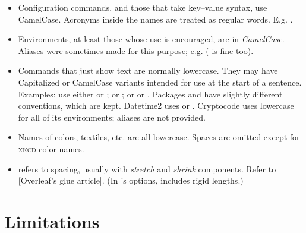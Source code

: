 \begin{BigPages} [hmargin=0.5cm, vmargin=1cm]
\begin{itemize}[long]
    \item Configuration commands, and those that take key--value syntax, use CamelCase.
          Acronyms inside the names are treated as regular words. E.g. .
    \item Environments, at least those whose use is encouraged, are in \textit{CamelCase}.
          Aliases were sometimes made for this purpose; e.g. 
          ( is fine too).
    \item Commands that just show text are normally lowercase. They may have Capitalized or CamelCase
          variants intended for use at the start of a sentence.
          Examples: use either \macro{\indx} or \macro{\Indx};  or ; or
           or .
          Packages  and  have slightly different conventions, which are kept.
          Datetime2 uses  or .
          Cryptocode uses lowercase for all of its environments; aliases are not provided.
    \item Names of colors, textiles, etc. are all lowercase. Spaces are omitted except for \textsc{xkcd} color names.
    \item {} refers to spacing, usually with \textit{stretch} and \textit{shrink} components.
          Refer to [Overleaf's glue article]. (In \desert's options,  includes rigid lengths.)
\end{itemize}

\section{Limitations}


\end{BigPages}

